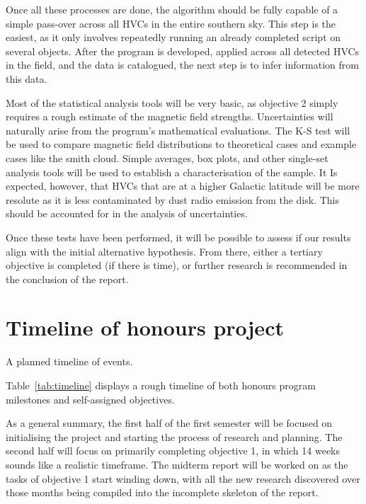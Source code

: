 Once all these processes are done, the algorithm should be fully capable of a simple pass-over across all HVCs in the entire southern sky. This step is the easiest, as it only involves repeatedly running an already completed script on several objects. After the program is developed, applied across all detected HVCs in the field, and the data is catalogued, the next step is to infer information from this data.

Most of the statistical analysis tools will be very basic, as objective 2 simply requires a rough estimate of the magnetic field strengths. Uncertainties will naturally arise from the program's mathematical evaluations. The K-S test will be used to compare magnetic field distributions to theoretical cases and example cases like the smith cloud. Simple averages, box plots, and other single-set analysis tools will be used to establish a characterisation of the sample. It Is expected, however, that HVCs that are at a higher Galactic latitude will be more resolute as it is less contaminated by dust radio emission from the disk. This should be accounted for in the analysis of uncertainties.

Once these tests have been performed, it will be possible to assess if our results align with the initial alternative hypothesis. From there, either a tertiary objective is completed (if there is time), or further research is recommended in the conclusion of the report.

\section{Timeline of honours project}
\label{sec:timeline}

\begin{table}[ht]
  \centering
  
  \caption{A planned timeline of events.}
  \label{tab:timeline}
\end{table}

Table~\ref{tab:timeline} displays a rough timeline of both honours program milestones and self-assigned objectives.

As a general summary, the first half of the first semester will be focused on initialising the project and starting the process of research and planning. The second half will focus on primarily completing objective 1, in which 14 weeks sounds like a realistic timeframe. The midterm report will be worked on as the tasks of objective 1 start winding down, with all the new research discovered over those months being compiled into the incomplete skeleton of the report.

